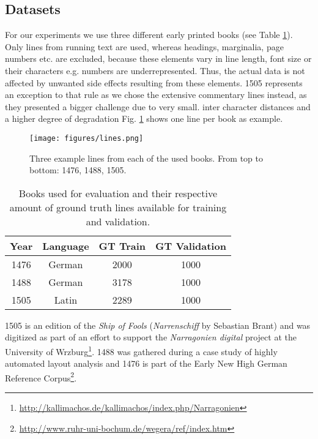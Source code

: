 \documentclass{jlcl}
\begin{document}
\subsection{Datasets}
For our experiments we use three different early printed books (see Table \ref{tab:books}).
Only lines from running text are used, whereas headings, marginalia, page numbers etc. are excluded, because these elements vary in line length, font size or their characters e.g. numbers are underrepresented.
Thus, the actual data is not affected by unwanted side effects resulting from these elements.
1505 represents an exception to that rule as we chose the extensive commentary lines instead, as they presented a bigger challenge due to very small. inter character distances and a higher degree of degradation
Fig. \ref{fig:lines} shows one line per book as example.

\begin{figure}[t]
\centering
\texttt{[image: figures/lines.png]}
\caption{Three example lines from each of the used books. From top to bottom: 1476, 1488, 1505.}
\label{fig:lines}
\end{figure}

\begin{table}[t]
\centering
\caption{Books used for evaluation and their respective amount of ground truth lines available for training and validation.}
\label{tab:books}
\begin{tabular}{cccc}
\hline
\textbf{Year} & \textbf{Language} & \textbf{GT Train} & \textbf{GT Validation} \\
\hline
1476             & German             & 2000              & 1000 \\
1488             & German             & 3178              & 1000 \\
1505             & Latin              & 2289              & 1000 \\
\hline
\end{tabular}
\end{table}
1505 is an edition of the \textit{Ship of Fools} (\textit{Narrenschiff} by Sebastian Brant) and was digitized as part of an effort to support the \textit{Narragonien digital} project at the University of Wrzburg\footnote{\url{http://kallimachos.de/kallimachos/index.php/Narragonien}}.
1488 was gathered during a case study of highly automated layout analysis \cite{reul2017dhl} and 1476 is part of the Early New High German Reference Corpus\footnote{\url{http://www.ruhr-uni-bochum.de/wegera/ref/index.htm}}.
\end{document}

